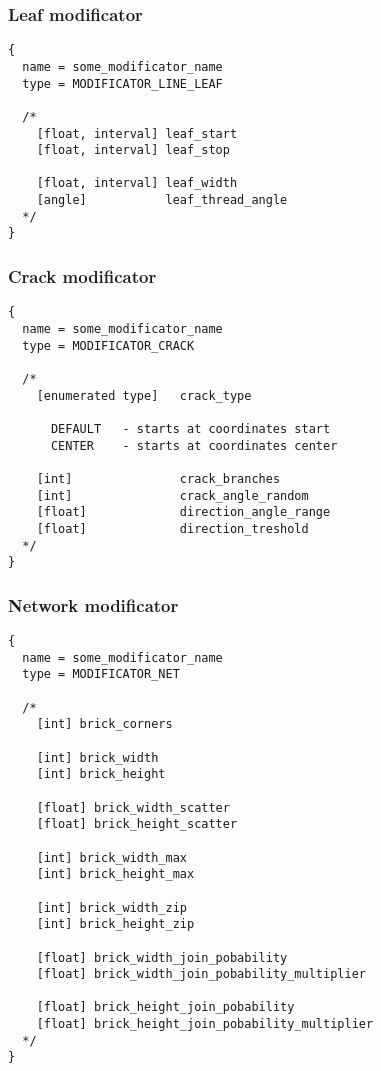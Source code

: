 \documentclass[9pt]{article}
\begin{document}
\subsubsection{Leaf modificator}

\begin{verbatim}
{
  name = some_modificator_name
  type = MODIFICATOR_LINE_LEAF

  /*
    [float, interval] leaf_start
    [float, interval] leaf_stop
  
    [float, interval] leaf_width
    [angle]           leaf_thread_angle  
  */
}
\end{verbatim}

\subsubsection{Crack modificator}

\begin{verbatim}
{
  name = some_modificator_name
  type = MODIFICATOR_CRACK

  /*
    [enumerated type]   crack_type
  
      DEFAULT   - starts at coordinates start
      CENTER    - starts at coordinates center

    [int]               crack_branches
    [int]               crack_angle_random
    [float]             direction_angle_range
    [float]             direction_treshold
  */
}
\end{verbatim}

\subsubsection{Network modificator}

\begin{verbatim}
{
  name = some_modificator_name
  type = MODIFICATOR_NET

  /*
    [int] brick_corners
        
    [int] brick_width
    [int] brick_height
        
    [float] brick_width_scatter
    [float] brick_height_scatter
        
    [int] brick_width_max
    [int] brick_height_max
        
    [int] brick_width_zip
    [int] brick_height_zip
        
    [float] brick_width_join_pobability
    [float] brick_width_join_pobability_multiplier
        
    [float] brick_height_join_pobability
    [float] brick_height_join_pobability_multiplier
  */
}
\end{verbatim}
\end{document}
